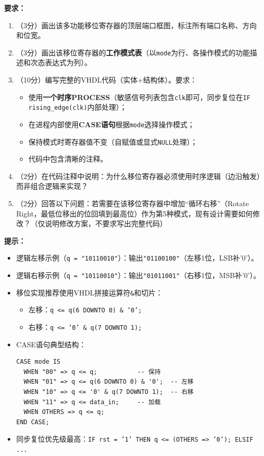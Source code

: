 \vspace{0.3cm}

\textbf{要求：}
\begin{enumerate}[label=(\arabic*)]
  \item （3分）画出该多功能移位寄存器的顶层端口框图，标注所有端口名称、方向和位宽。
  \item （3分）画出该移位寄存器的\textbf{工作模式表}（以\texttt{mode}为行、各操作模式的功能描述和次态表达式为列）。
  \item （10分）编写完整的VHDL代码（实体+结构体）。要求：
  \begin{itemize}
    \item 使用\textbf{一个时序PROCESS}（敏感信号列表包含\texttt{clk}即可，同步复位在\texttt{IF rising\_edge(clk)}内部处理）；
    \item 在进程内部使用\textbf{CASE语句}根据\texttt{mode}选择操作模式；
    \item 保持模式时寄存器值不变（自赋值或显式\texttt{NULL}处理）；
    \item 代码中包含清晰的注释。
  \end{itemize}
  \item （2分）在代码注释中说明：为什么移位寄存器必须使用时序逻辑（边沿触发）而非组合逻辑来实现？
  \item （2分）回答以下问题：若需要在该移位寄存器中增加“循环右移”（Rotate Right，最低位移出的位回填到最高位）作为第5种模式，现有设计需要如何修改？（仅说明修改方案，不要求写出完整代码）
\end{enumerate}

\begin{framed}
\textbf{提示：}
\begin{itemize}
  \item 逻辑左移示例（\texttt{q = "10110010"}）：输出\texttt{"01100100"}（左移1位，LSB补'0'）。
  \item 逻辑右移示例（\texttt{q = "10110010"}）：输出\texttt{"01011001"}（右移1位，MSB补'0'）。
  \item 移位实现推荐使用VHDL拼接运算符\texttt{\&}和切片：
  \begin{itemize}
    \item 左移：\texttt{q <= q(6 DOWNTO 0) \& '0';}
    \item 右移：\texttt{q <= '0' \& q(7 DOWNTO 1);}
  \end{itemize}
  \item CASE语句典型结构：
\begin{verbatim}
CASE mode IS
  WHEN "00" => q <= q;           -- 保持
  WHEN "01" => q <= q(6 DOWNTO 0) & '0';  -- 左移
  WHEN "10" => q <= '0' & q(7 DOWNTO 1);  -- 右移
  WHEN "11" => q <= data_in;     -- 加载
  WHEN OTHERS => q <= q;
END CASE;
\end{verbatim}
  \item 同步复位优先级最高：\texttt{IF rst = '1' THEN q <= (OTHERS => '0'); ELSIF ...}
\end{itemize}
\end{framed}

